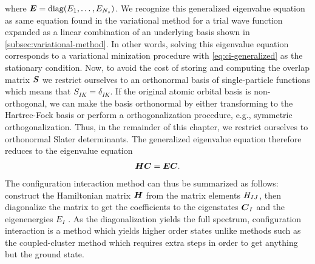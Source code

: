         where $\boldsymbol{E} = \operatorname{diag}(E_1, \dots, E_{N_s})$.
        We recognize this generalized eigenvalue equation as same equation found
        in the variational method for a trial wave function expanded as a linear
        combination of an underlying basis shown in
        \autoref{subsec:variational-method}.
        In other words, solving this eigenvalue equation corresponds to a
        variational minization procedure with \autoref{eq:ci-generalized} as the
        stationary condition.
        Now, to avoid the cost of storing and computing the overlap matrix
        $\boldsymbol{S}$ we restrict ourselves to an orthonormal basis of
        single-particle functions which means that $S_{IK} = \delta_{IK}$.
        If the original atomic orbital basis is non-orthogonal, we can make the
        basis orthonormal by either transforming to the Hartree-Fock basis or
        perform a orthogonalization procedure, e.g., symmetric
        orthogonalization.
        Thus, in the remainder of this chapter, we restrict ourselves to
        orthonormal Slater determinants.
        The generalized eigenvalue equation therefore reduces to the eigenvalue
        equation
        \begin{align}
            \boldsymbol{H}\boldsymbol{C} = \boldsymbol{E}\boldsymbol{C}.
        \end{align}
        The configuration interaction method can thus be summarized as follows:
        construct the Hamiltonian matrix $\boldsymbol{H}$ from the matrix elements
        $H_{IJ}$, then diagonalize the matrix to get the coefficients to
        the eigenstates $\boldsymbol{C}_I$ and the eigenenergies $E_I$
        \cite{karwowski}.
        As the diagonalization yields the full spectrum, configuration
        interaction is a method which yields higher order states unlike methods
        such as the coupled-cluster method which requires extra steps in order
        to get anything but the ground state.

